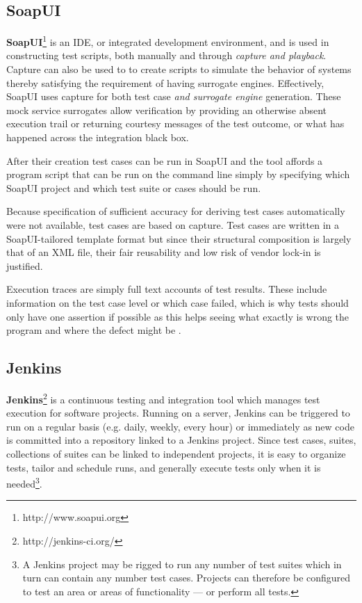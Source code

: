 \documentclass[12pt,a4paper,oneside,pdftex]{report}
\begin{document}
{\subsection{SoapUI}

\textbf{SoapUI}\footnote{http://www.soapui.org} is an IDE, or integrated development environment, and is used in constructing test scripts, both manually and through \emph{capture and playback}. Capture can also be used to to create scripts to simulate the behavior of systems thereby satisfying the requirement of having surrogate engines. Effectively, SoapUI uses capture for both test case \emph{and surrogate engine} generation. These mock service surrogates allow verification by providing an otherwise absent execution trail or returning courtesy messages of the test outcome, or what has happened across the integration black box.

After their creation test cases can be run in SoapUI and the tool affords a program script that can be run on the command line simply by specifying which SoapUI project and which test suite or cases should be run.

Because specification of sufficient accuracy for deriving test cases automatically were not available, test cases are based on capture. Test cases are written in a SoapUI-tailored template format but since their structural composition is largely that of an XML file, their fair reusability and low risk of vendor lock-in is justified. 

Execution traces are simply full text accounts of test results. These include information on the test case level or which case failed, which is why tests should only have one assertion if possible as this helps seeing what exactly is wrong the program and where the defect might be \citep{duvall2007continuous}.

\subsection{Jenkins}

\textbf{Jenkins}\footnote{http://jenkins-ci.org/} is a continuous testing and integration tool which manages test execution for software projects. Running on a server, Jenkins can be triggered to run on a regular basis (e.g. daily, weekly, every hour) or immediately as new code is committed into a repository linked to a Jenkins project. Since test cases, suites, collections of suites can be linked to independent projects, it is easy to organize tests, tailor and schedule runs, and generally execute tests only when it is needed\footnote{A Jenkins project may be rigged to run any number of test suites which in turn can contain any number test cases. Projects can therefore be configured to test an area or areas of functionality --- or perform all tests.}.

}
\end{document}
